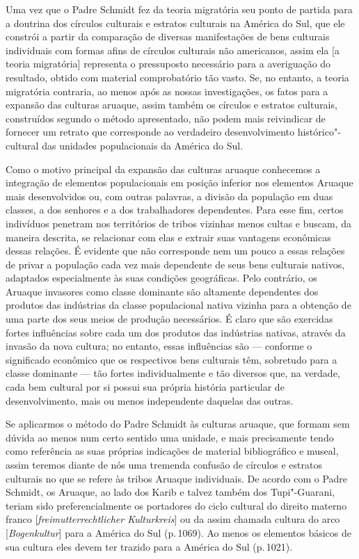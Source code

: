 Uma vez que o Padre Schmidt fez da teoria migratória seu ponto de
partida para a doutrina dos círculos culturais e estratos culturais na
América do Sul, que ele constrói a partir da comparação de diversas
manifestações de bens culturais individuais com formas afins de
círculos culturais não americanos, assim ela {[}a teoria migratória{]}
representa o pressuposto necessário para a averiguação do resultado,
obtido com material comprobatório tão vasto. Se, no entanto, a teoria
migratória contraria, ao menos após as nossas investigações, os fatos
para a expansão das culturas aruaque, assim também os círculos e
estratos culturais, construídos segundo o método apresentado, não podem
mais reivindicar de fornecer um retrato que corresponde ao verdadeiro
desenvolvimento histórico"-cultural das unidades populacionais da América
do Sul.

Como o motivo principal da expansão das culturas aruaque conhecemos a
integração de elementos populacionais em posição inferior nos elementos
Aruaque mais desenvolvidos ou, com outras palavras, a divisão da
população em duas classes, a dos senhores e a dos trabalhadores
dependentes. Para esse fim, certos indivíduos penetram nos territórios
de tribos vizinhas menos cultas e buscam, da maneira descrita, se
relacionar com elas e extrair suas vantagens econômicas dessas relações.
É evidente que não corresponde nem um pouco a essas relações de privar
a população cada vez mais dependente de seus bens culturais nativos,
adaptados especialmente às suas condições geográficas. Pelo contrário,
os Aruaque invasores como classe dominante são altamente dependentes
dos produtos das indústrias da classe populacional nativa vizinha para
a obtenção de uma parte dos seus meios de produção necessários. É claro
que são exercidas fortes influências sobre cada um dos produtos das
indústrias nativas, através da invasão da nova cultura; no entanto,
essas influências são --- conforme o significado econômico que os
respectivos bens culturais têm, sobretudo para a classe dominante --- tão
fortes individualmente e tão diversos que, na verdade, cada bem cultural
por si possui sua própria história particular de desenvolvimento, mais
ou menos independente daquelas das outras.

Se aplicarmos o método do Padre Schmidt às culturas aruaque, que formam
sem dúvida ao menos num certo sentido uma unidade, e mais precisamente
tendo como referência as suas próprias indicações de material
bibliográfico e museal, assim teremos diante de nós uma tremenda
confusão de círculos e estratos culturais no que se refere às tribos
Aruaque individuais. De acordo com o Padre Schmidt, os Aruaque, ao lado
dos Karib e talvez também dos Tupi"-Guarani, teriam sido
preferencialmente os portadores do ciclo cultural do direito materno
franco {[}\textit{freimutterrechtlicher Kulturkreis}{]} ou da assim
chamada cultura do arco {[}\textit{Bogenkultur}{]} para a América do Sul
(p.\,1069). Ao menos os elementos básicos de sua cultura eles devem ter
trazido para a América do Sul (p.\,1021).

